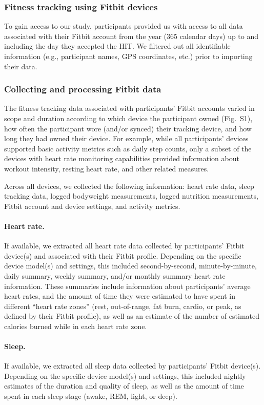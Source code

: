 \documentclass[10pt]{article}
\newcommand{\devices}{S1}
\begin{document}
\subsubsection*{Fitness tracking using Fitbit devices}
To gain access to our study, participants provided us with access to
all data associated with their Fitbit account from the year (365
calendar days) up to and including the day they accepted the HIT.  We
filtered out all identifiable information (e.g., participant names,
GPS coordinates, etc.) prior to importing their data.

\subsubsection*{Collecting and processing Fitbit data}

The fitness tracking data associated with participants' Fitbit
accounts varied in scope and duration according to which device the
participant owned (Fig.~\devices), how often the participant
wore (and/or synced) their tracking device, and how long they had
owned their device.  For example, while all participants' devices
supported basic activity metrics such as daily step counts, only a
subset of the devices with heart rate monitoring capabilities provided
information about workout intensity, resting heart rate, and other
related measures.


Across all devices, we collected the following information: heart rate
data, sleep tracking data, logged bodyweight measurements, logged
nutrition measurements, Fitbit account and device settings, and
activity metrics.

\paragraph{Heart rate.}  If available, we extracted all heart rate
data collected by participants' Fitbit device(s) and associated with
their Fitbit profile.  Depending on the specific device model(s) and
settings, this included second-by-second, minute-by-minute, daily
summary, weekly summary, and/or monthly summary heart rate
information.  These summaries include information about participants'
average heart rates, and the amount of time they were estimated to
have spent in different ``heart rate zones'' (rest, out-of-range, fat
burn, cardio, or peak, as defined by their Fitbit profile), as well as
an estimate of the number of estimated calories burned while in each
heart rate zone.

\paragraph{Sleep.}  If available, we extracted all sleep data
collected by participants' Fitbit device(s).  Depending on the
specific device model(s) and settings, this included nightly estimates
of the duration and quality of sleep, as well as the amount of time
spent in each sleep stage (awake, REM, light, or deep).
\end{document}
